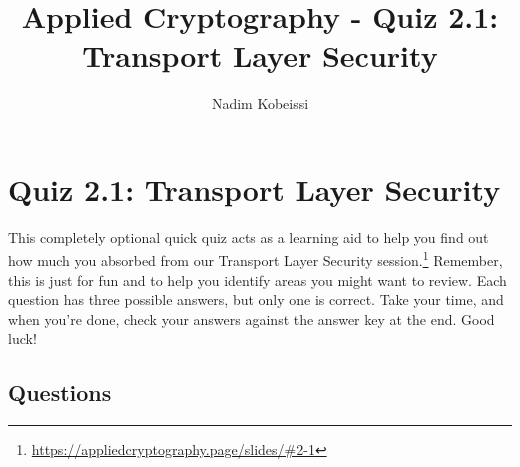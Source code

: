 \documentclass[10pt,a4paper,american]{exam}
\title{Applied Cryptography - Quiz 2.1: Transport Layer Security}
\author{Nadim Kobeissi}
\begin{document}
\classhandoutheader
\section*{Quiz 2.1: Transport Layer Security}

\begin{tcolorbox}[colframe=OliveGreen!30!white,colback=OliveGreen!5!white]
	This completely optional quick quiz acts as a learning aid to help you find out how much you absorbed from our Transport Layer Security session.\footnote{\url{https://appliedcryptography.page/slides/\#2-1}} Remember, this is just for fun and to help you identify areas you might want to review. Each question has three possible answers, but only one is correct. Take your time, and when you're done, check your answers against the answer key at the end. Good luck!
\end{tcolorbox}

\subsection*{Questions}
\end{document}
